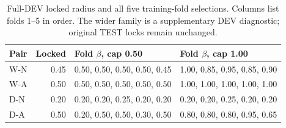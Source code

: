 \begin{table}[htbp]
\centering\footnotesize
\setlength{\tabcolsep}{3.5pt}
\caption{Full-DEV locked radius and all five training-fold selections. Columns list folds 1--5 in order. The wider family is a supplementary DEV diagnostic; original TEST locks remain unchanged.}
\label{tab:conservative-folds}
\begin{tabular}{lrll}
\toprule
Pair & Locked & Fold $\beta$, cap 0.50 & Fold $\beta$, cap 1.00\\
\midrule
W-N & 0.45 & 0.50, 0.50, 0.50, 0.50, 0.45 & 1.00, 0.85, 0.95, 0.85, 0.90\\
W-A & 0.50 & 0.50, 0.50, 0.50, 0.50, 0.50 & 1.00, 1.00, 1.00, 1.00, 1.00\\
D-N & 0.20 & 0.20, 0.20, 0.25, 0.20, 0.20 & 0.20, 0.20, 0.25, 0.20, 0.20\\
D-A & 0.50 & 0.20, 0.50, 0.50, 0.30, 0.50 & 0.80, 0.80, 0.80, 0.95, 0.65\\
\bottomrule
\end{tabular}
\end{table}
